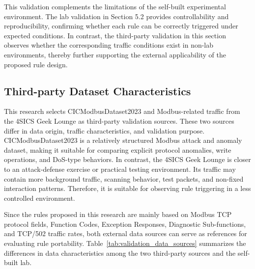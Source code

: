 This validation complements the limitations of the self-built experimental environment. The lab validation in Section 5.2 provides controllability and reproducibility, confirming whether each rule can be correctly triggered under expected conditions. In contrast, the third-party validation in this section observes whether the corresponding traffic conditions exist in non-lab environments, thereby further supporting the external applicability of the proposed rule design.
\newpage

\subsection{Third-party Dataset Characteristics}
This research selects CICModbusDataset2023 and Modbus-related traffic from the 4SICS Geek Lounge as third-party validation sources. These two sources differ in data origin, traffic characteristics, and validation purpose. CICModbusDataset2023 is a relatively structured Modbus attack and anomaly dataset, making it suitable for comparing explicit protocol anomalies, write operations, and DoS-type behaviors. In contrast, the 4SICS Geek Lounge is closer to an attack-defense exercise or practical testing environment. Its traffic may contain more background traffic, scanning behavior, test packets, and non-fixed interaction patterns. Therefore, it is suitable for observing rule triggering in a less controlled environment.

Since the rules proposed in this research are mainly based on Modbus TCP protocol fields, Function Codes, Exception Responses, Diagnostic Sub-functions, and TCP/502 traffic rates, both external data sources can serve as references for evaluating rule portability. Table~\ref{tab:validation_data_sources} summarizes the differences in data characteristics among the two third-party sources and the self-built lab.

